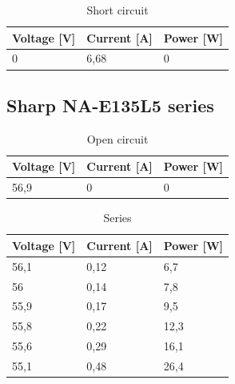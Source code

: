 \documentclass[12pt]{article}
\begin{document}
\begin{table}[!h]
	\centering
	\begin{tabular}{|p{2cm}|p{2cm}|p{2cm}|}
		\hline
		\rowcolor{Red!80} Voltage [V] & Current [A] & Power [W] \\
		\hline
		\rowcolor{Red!60} 0           & 6,68        & 0         \\
		\hline
	\end{tabular}
	\caption{Short circuit}
	\label{tab:my_label}
\end{table}
\FloatBarrier
\subsection{Sharp NA-E135L5 series}
\begin{table}[!h]
	\centering
	\begin{tabular}{|p{2cm}|p{2cm}|p{2cm}|}
		\hline
		\rowcolor{RoyalBlue!80} Voltage [V] & Current [A] & Power [W] \\
		\hline
		\rowcolor{Cerulean!70}     56,9     & 0           & 0         \\
		\hline
	\end{tabular}
	\caption{Open circuit}
	\label{tab:my_label}
\end{table}

\begin{table}[!h]
	\centering
	\begin{tabular}{|p{2cm}|p{2cm}|p{2cm}|}
		\hline
		\rowcolor{Green!80} Voltage [V]  & Current [A] & Power [W] \\
		\hline
		\rowcolor{LimeGreen!70}   56,1   & 0,12        & 6,7       \\
		\hline
		\rowcolor{YellowGreen!70}  56    & 0,14        & 7,8       \\
		\hline
		\rowcolor{LimeGreen!70}     55,9 & 0,17        & 9,5       \\
		\hline
		\rowcolor{YellowGreen!70}  55,8  & 0,22        & 12,3      \\
		\hline
		\rowcolor{LimeGreen!70}    55,6  & 0,29        & 16,1      \\
		\hline
		\rowcolor{YellowGreen!70} 55,1   & 0,48        & 26,4      \\
		\hline
	\end{tabular}
	\caption{Series}
	\label{tab:my_label}
\end{table}
\end{document}
